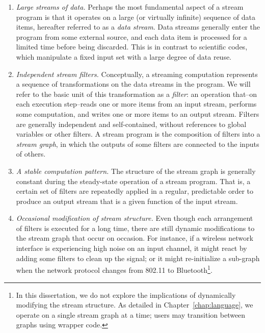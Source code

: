 \begin{enumerate}

\item {\it Large streams of data.}  Perhaps the most fundamental
  aspect of a stream program is that it operates on a large (or
  virtually infinite) sequence of data items, hereafter referred to as
  a {\it data stream}.  Data streams generally enter the program from
  some external source, and each data item is processed for a limited
  time before being discarded.  This is in contrast to scientific
  codes, which manipulate a fixed input set with a large degree of
  data reuse.

\item {\it Independent stream filters.}  Conceptually, a streaming
  computation represents a sequence of transformations on the data
  streams in the program.  We will refer to the basic unit of this
  transformation as a {\it filter}: an operation that--on each
  execution step--reads one or more items from an input stream,
  performs some computation, and writes one or more items to an output
  stream.  Filters are generally independent and self-contained,
  without references to global variables or other filters.  A stream
  program is the composition of filters into a {\it stream graph}, in
  which the outputs of some filters are connected to the inputs of
  others.

\item {\it A stable computation pattern.}  The structure of the stream
  graph is generally constant during the steady-state operation of a
  stream program.  That is, a certain set of filters are repeatedly
  applied in a regular, predictable order to produce an output stream
  that is a given function of the input stream.

\item {\it Occasional modification of stream structure.}  Even though
  each arrangement of filters is executed for a long time, there are
  still dynamic modifications to the stream graph that occur on
  occasion.  For instance, if a wireless network interface is
  experiencing high noise on an input channel, it might react by
  adding some filters to clean up the signal; or it might
  re-initialize a sub-graph when the network protocol changes from
  802.11 to Bluetooth\footnote{In this dissertation, we do not explore
    the implications of dynamically modifying the stream structure.
    As detailed in Chapter~\ref{chap:language}, we operate on a single
    stream graph at a time; users may transition between graphs using
    wrapper code.}.


\end{enumerate}
